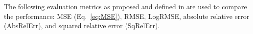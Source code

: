 

The following evaluation metrics as proposed and defined in \cite{eigen2014firstNNdepth_map_pred} are used to compare the performance: MSE (Eq.~\ref{eq:MSE}), RMSE, LogRMSE, absolute relative error (AbsRelErr), and squared relative error (SqRelErr).


